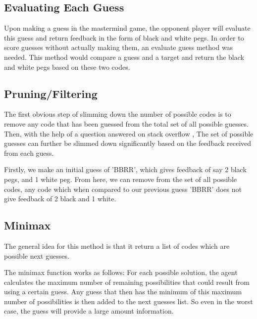 \documentclass[12pt]{article}
\begin{document}
\subsection{Evaluating Each Guess}
Upon making a guess in the mastermind game, the opponent player will evaluate this guess and return feedback in the form of black and white pegs. In order to score guesses without actually making them, an evaluate guess method was needed. This method would compare a guess and a target and return the black and white pegs based on these two codes. 


\subsection{Pruning/Filtering}
The first obvious step of slimming down the number of possible codes is to remove any code that has been guessed from the total set of all possible guesses. Then, with the help of a question answered on stack overflow \cite{stack overflow pruning}, The set of possible guesses can further be slimmed down significantly based on the feedback received from each guess. 

Firstly, we make an initial guess of 'BBRR', which gives feedback of say 2 black pegs, and 1 white peg. From here, we can remove from the set of all possible codes, any code which when compared to our previous guess 'BBRR' does not give feedback of 2 black and 1 white. 

\subsection{Minimax}
The general idea for this method is that it return a list of codes which are possible next guesses. 

The minimax function works as follows:
For each possible solution, the agent calculates the maximum number of remaining possibilities that could result from using a certain guess. Any guess that then has the minimum of this maximum number of possibilities is then added to the next guesses list. So even in the worst case, the guess will provide a large amount information.
\end{document}
